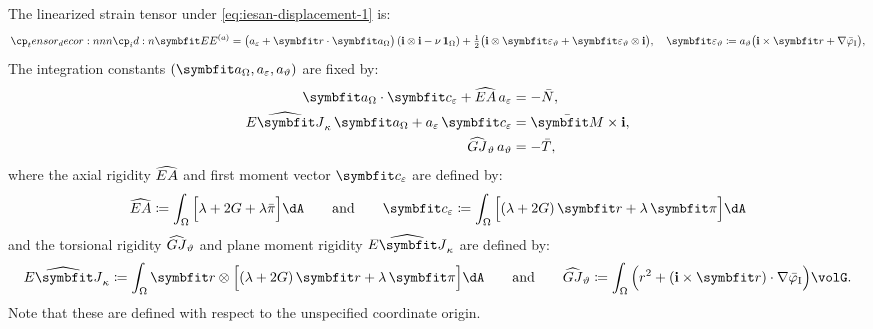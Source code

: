 The linearized strain tensor under \eqref{eq:iesan-displacement-1} is:
\begin{equation}
\StrainTensor^{(a)}=
\big(a_{\varepsilon}+\bm{r}\cdot\bm{a}_{\Section}\big)\,(\FrameBasis\otimes\FrameBasis-\nu\,\oneS)
+\tfrac12\big(\FrameBasis\otimes\bm\varepsilon_\vartheta+\bm\varepsilon_\vartheta\otimes\FrameBasis\big),
\quad
\bm\varepsilon_\vartheta \coloneq a_\vartheta\big(\FrameBasis\times\bm{r}+\nabla\WarpTwistIesan\big),
\label{eq:iesan-strain-tensor-1}
\end{equation}
The integration constants \((\bm{a}_{\Section},a_{\varepsilon},a_\vartheta)\) are fixed by:
%
\begin{equation}
\begin{aligned}
\bm{a}_{\Section}\cdot \AxialCoupling+\AxialRigidity\, a_{\varepsilon} &=-\AxialRxn,\\
\CoupleRigidity\,\bm{a}_{\Section}+a_{\varepsilon}\,\AxialCoupling &=\MomentRxn\times\FrameBasis,\\
\TwistRigidity\,a_\vartheta&=-\TwistRxn,
\end{aligned}
\label{eq:2-15}
\end{equation}
where the axial rigidity \(\widehat{EA}\) and first moment vector \(\AxialCoupling\) are defined by:
\begin{equation}
\AxialRigidity \coloneq \int_\Section \Big[\lambda+2G+\lambda\bar{\pi}\Big]\dA
\qquad\text{and}\qquad
\AxialCoupling \coloneq \int_\Section \Big[(\lambda+2G)\,\bm{r}+\lambda\,\PlaneShapeStrain\Big]\dA
\label{eq:def-axial-rigidity}
\end{equation}
and the torsional rigidity \(\widehat{GJ}_{\vartheta}\) and plane moment rigidity \(\CoupleRigidity\) are defined by:
\begin{equation}
\CoupleRigidity \coloneq \int_{\Section}\bm{r}\otimes\Big[(\lambda+2G)\,\bm{r}+\lambda\,\PlaneShapeStrain\Big]\dA
\qquad\text{and}\qquad
\TwistRigidity \coloneq \int_{\Section} \Big(r^2+(\FrameBasis\times\bm{r})\cdot\nabla\WarpTwistIesan\Big)\volG .
\label{eq:def-j-origin}
\end{equation}
Note that these are defined with respect to the unspecified coordinate origin. 


